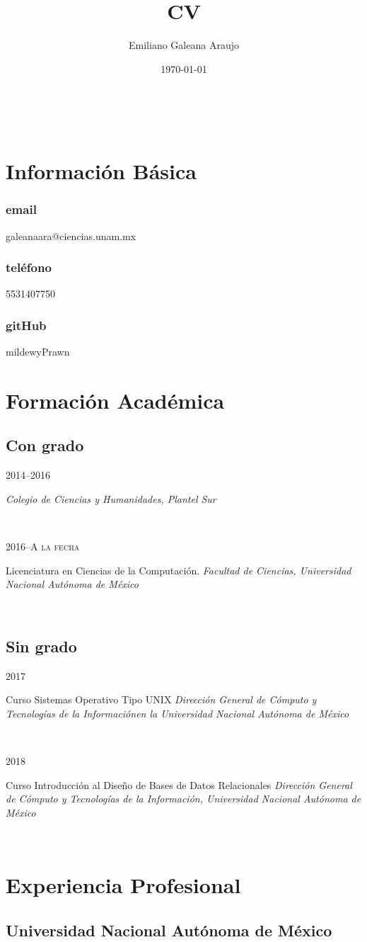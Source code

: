 \documentclass{article}
\makeatletter
\renewcommand{\maketitle}{
  \begin{center}
    {\huge\bfseries
      \theauthor}
    \vspace{.25em}\\
\end{center}
}
\newcommand{\UNAM}{Universidad Nacional Aut\'onoma de M\'exico}
\newcommand{\CCH}{Colegio de Ciencias y Humanidades, Plantel Sur}
\newcommand{\FC}{Facultad de Ciencias}
\newcommand{\DGTIC}{Direcci\'on General de C\'omputo y Tecnolog\'ias de la
  Informaci\'on}
\newcommand{\entry}[4]{
  
  \begin{minipage}[t]{.15\textwidth}
    \hfill \textsc{#1}
  \end{minipage}
  \hfill\vline\hfill
  \begin{minipage}[t]{.80\textwidth}
    #2
    \textit{#3}
    \footnotesize{#4}
  \end{minipage}\\\vspace{.25cm}
}
\makeatother
\begin{document}
\title{CV}
\author{Emiliano Galeana Araujo}
\date{\today}

\maketitle

\section{Informaci\'on B\'asica}

\subsubsection{email} galeanaara@ciencias.unam.mx

\subsubsection{tel\'efono} 5531407750

\subsubsection{gitHub} mildewyPrawn

\section{Formaci\'on Acad\'emica}

\subsection{Con grado}
\entry{2014--2016}
{}
{\CCH}
{}

\entry{2016--A la fecha}
{Licenciatura en Ciencias de la Computación.}
{\FC, \UNAM}
{}

\subsection{Sin grado}
\entry{2017}
{Curso Sistemas Operativo Tipo UNIX}
{\DGTIC en la \UNAM}
{}

\entry{2018}
{Curso Introducci\'on al Diseño de Bases de Datos Relacionales}
{\DGTIC, \UNAM}
{}


\section{Experiencia Profesional}

\subsection{\UNAM}
\end{document}
